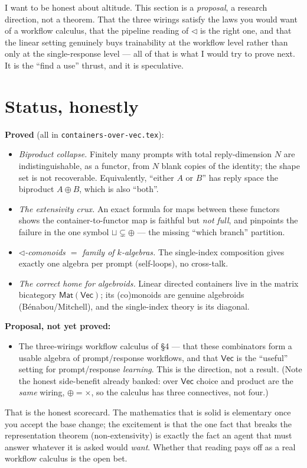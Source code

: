 \documentclass[11pt]{article}
\providecommand{\Vec}{}\renewcommand{\Vec}{\mathsf{Vec}}
\begin{document}
I want to be honest about altitude. This section is a \emph{proposal}, a research direction,
not a theorem. That the three wirings satisfy the laws you would want of a workflow
calculus, that the pipeline reading of $\lhd$ is the right one, and that the linear setting
genuinely buys trainability at the workflow level rather than only at the single-response
level --- all of that is what I would try to prove next. It is the ``find a use'' thrust,
and it is speculative.

\section{Status, honestly}

\textbf{Proved} (all in \texttt{containers-over-vec.tex}):
\begin{itemize}[leftmargin=1.4em,itemsep=1pt]
\item \emph{Biproduct collapse.} Finitely many prompts with total reply-dimension $N$ are
  indistinguishable, as a functor, from $N$ blank copies of the identity; the shape set is
  not recoverable. Equivalently, ``either $A$ or $B$'' has reply space the biproduct
  $A\oplus B$, which is also ``both''.
\item \emph{The extensivity crux.} An exact formula for maps between these functors shows
  the container-to-functor map is faithful but \emph{not full}, and pinpoints the failure in
  the one symbol $\sqcup\subsetneq\oplus$ --- the missing ``which branch'' partition.
\item \emph{$\lhd$-comonoids $=$ family of $k$-algebras.} The single-index composition gives
  exactly one algebra per prompt (self-loops), no cross-talk.
\item \emph{The correct home for algebroids.} Linear directed containers live in the matrix
  bicategory $\mathsf{Mat}(\Vec)$; its (co)monoids are genuine algebroids
  (B\'enabou/Mitchell), and the single-index theory is its diagonal.
\end{itemize}

\textbf{Proposal, not yet proved:}
\begin{itemize}[leftmargin=1.4em,itemsep=1pt]
\item The three-wirings workflow calculus of \S4 --- that these combinators form a usable
  algebra of prompt/response workflows, and that $\Vec$ is the ``useful'' setting for
  prompt/response \emph{learning}. This is the direction, not a result. (Note the honest
  side-benefit already banked: over $\Vec$ choice and product are the \emph{same} wiring,
  $\oplus=\times$, so the calculus has three connectives, not four.)
\end{itemize}

That is the honest scorecard. The mathematics that is solid is elementary once you accept
the base change; the excitement is that the one fact that breaks the representation theorem
(non-extensivity) is exactly the fact an agent that must answer whatever it is asked would
\emph{want}. Whether that reading pays off as a real workflow calculus is the open bet.
\end{document}
